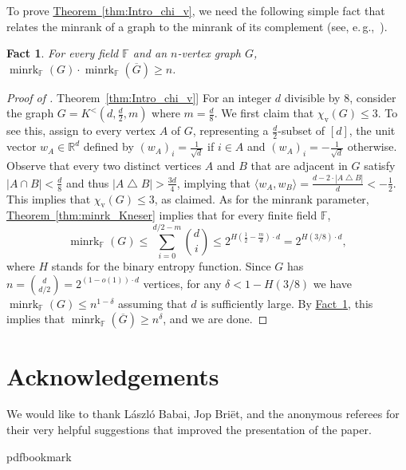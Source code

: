 \documentclass[11pt]{article}
\numberwithin{equation}{section}
\newtheorem{fact}[theorem]{Fact}
\theoremstyle{definition}
\theoremstyle{plain}
\newcommand{\R}{\mathbb R}
\newcommand{\expref}[2]{\hyperref[#2]{#1~\ref{#2}}}
\newcommand{\Fset}{\mathbb{F}}
\newcommand{\minrank}{\mathop{\mathrm{minrk}}}
\newcommand{\vchrom}{{\chi_\mathrm{v}}}
\newcommand\Kneser[3]{K^<(#1,#2,#3)}
\begin{document}
To prove \expref{Theorem}{thm:Intro_chi_v}, we need the following simple fact that relates the minrank of a graph to the minrank of its complement (see, e.\,g.,~\cite[Remark~2.2]{Peeters96}).

\begin{fact}\label{fact:minrank_comp}
For every field $\Fset$ and an $n$-vertex graph $G$, $\minrank_{\Fset}(G) \cdot \minrank_{\Fset}(\overline{G}) \geq n$.
\end{fact}

\begin{proof}[Proof of \expref{Theorem}{thm:Intro_chi_v}]
For an integer $d$ divisible by $8$, consider the graph $G = \Kneser{d}{\frac{d}{2}}{m}$ where $m = \frac{d}{8}$.
We first claim that $\vchrom(G) \leq 3$.
To see this, assign to every vertex $A$ of $G$, representing a $\frac{d}{2}$-subset of $[d]$, the unit vector $w_A \in \R^d$ defined by $(w_A)_i = \frac{1}{\sqrt{d}}$ if $i \in A$ and $(w_A)_i = - \frac{1}{\sqrt{d}}$ otherwise.
Observe that every two distinct vertices $A$ and $B$ that are adjacent in $G$ satisfy $|A \cap B| < \frac{d}{8}$ and thus $|A \bigtriangleup B| > \frac{3d}{4}$, implying that $\langle w_A, w_B \rangle = \frac{d-2 \cdot |A \bigtriangleup B|}{d} < -\frac{1}{2}$. This implies that $\vchrom(G) \leq 3$, as claimed.
As for the minrank parameter, \expref{Theorem}{thm:minrk_Kneser} implies that for every finite field $\Fset$,
\[{\minrank}_{\Fset}(G) \leq \sum_{i=0}^{d/2-m}\binom{d}{i} \leq 2^{H(\frac{1}{2}-\frac{m}{d}) \cdot d} = 2^{H(3/8) \cdot d},\]
where $H$ stands for the binary entropy function.
Since $G$ has $n = \binom{d}{d/2} = 2^{(1-o(1)) \cdot d}$ vertices, for any $\delta < 1- H(3/8)$ we have ${\minrank}_{\Fset}(G) \leq n^{1-\delta}$ assuming that $d$ is sufficiently large. By \expref{Fact}{fact:minrank_comp}, this implies that
${\minrank}_{\Fset}(\overline{G}) \geq n^{\delta}$, and we are done.
\end{proof}

\section*{Acknowledgements}
%
%
We would like to thank L{\'{a}}szl{\'{o}} Babai, Jop Bri{\"{e}}t, and the anonymous referees for their very helpful suggestions that improved the presentation of the paper.

\newcommand{\prelim}{Preliminary version in\ }\newcommand{\prelims}{Preliminary
  versions in\ }
\providecommand{\bibhead}[1]{}
\expandafter\ifx\csname pdfbookmark\endcsname\relax%
  \providecommand{\tocrefpdfbookmark}{}
\else\providecommand{\tocrefpdfbookmark}{%
   \hypertarget{tocreferences}{}%
   \pdfbookmark[1]{References}{tocreferences}}%
\fi
\end{document}
